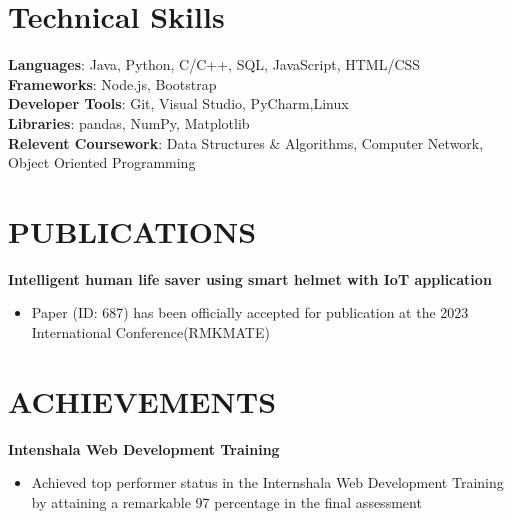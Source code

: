 \documentclass[letterpaper,11pt]{article}
\makeatletter
\newcommand{\resumeItem}[1]{
  \item\small{
    {#1 \vspace{-2pt}}
  }
}
\newcommand{\resumeSubSubheading}[2]{
    \item
    \begin{tabular*}{0.97\textwidth}{l@{\extracolsep{\fill}}r}
      \textit{\small#1} & \textit{\small #2} \\
    \end{tabular*}\vspace{-7pt}
}
\newcommand{\resumeSubHeadingListEnd}{\end{itemize}}
\newcommand{\resumeItemListStart}{\begin{itemize}}
\newcommand{\resumeItemListEnd}{\end{itemize}\vspace{-5pt}}
\makeatother
\begin{document}

\section{Technical Skills}
 \begin{itemize}[leftmargin=0.15in, label={}]
    \small{\item{
     \textbf{Languages}{: Java, Python, C/C++, SQL, JavaScript, HTML/CSS} \\
     \textbf{Frameworks}{: Node.js, Bootstrap} \\
     \textbf{Developer Tools}{: Git, Visual Studio, PyCharm,Linux} \\
     \textbf{Libraries}{: pandas, NumPy, Matplotlib}\\
\textbf{Relevent Coursework}{: Data Structures \& Algorithms, Computer Network, Object Oriented Programming } 
    }}
 \end{itemize}
 \section{PUBLICATIONS}
 \begin{itemize}[leftmargin=0.15in, label={}]
    \small{\item{
     {\textbf{Intelligent human life saver using smart helmet with IoT application}} \\
    \resumeItemListStart
            \resumeItem{Paper (ID: 687) has been officially accepted for publication at the 2023 International Conference(RMKMATE)} 
          \resumeItemListEnd
    }}
 \end{itemize}
 \section{ACHIEVEMENTS}
 \begin{itemize}[leftmargin=0.15in, label={}]
    \small{\item{
     {\textbf{Intenshala Web Development Training}} \\
    \resumeItemListStart
            \resumeItem{Achieved top performer status in the Internshala Web Development Training by attaining a remarkable 97 percentage in the final assessment} 
          \resumeItemListEnd
    }}
 \end{itemize}
\end{document}
